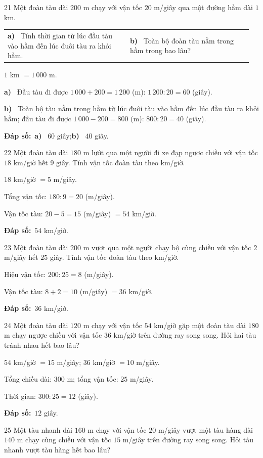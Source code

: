 \documentclass[11pt]{article}
\makeatletter
\newif\ifsol \solfalse
\renewcommand{\arraystretch}{1.35}
\providecommand{\AnsWord}{Đáp số}
\newcommand{\dapso}[1]{\par\textbf{\AnsWord:}\ #1}
\newcommand{\probsol}[1]{%
  \begin{lrbox}{\solmeasure}\begin{minipage}{\dimexpr\linewidth-24pt\relax}#1\end{minipage}\end{lrbox}%
  \ifsol
    \begin{solbox}#1\end{solbox}%
  \else
    \setlength{\solht}{\dimexpr\ht\solmeasure+\dp\solmeasure+0.85cm\relax}%
    \ifdim\solht<1.35cm\setlength{\solht}{1.35cm}\fi
    \begin{tcolorbox}[colback=white,colframe=Line,boxrule=0.8pt,arc=5pt,
      left=8pt,right=8pt,top=4pt,bottom=4pt,height=\solht]{\footnotesize\color{Slate}\itshape\WorkWord}\end{tcolorbox}%
  \fi}
\newcommand{\pa}[1]{\textbf{#1)}\ }
\newenvironment{cols2}{\par\vspace{3pt}\noindent\setlength{\tabcolsep}{0pt}\renewcommand{\arraystretch}{1.3}%
  \begin{tabular}{@{}>{\raggedright\arraybackslash\rule{0pt}{4.4ex}}p{0.48\linewidth}<{\rule[-2.3ex]{0pt}{0pt}}@{\hspace{0.03\linewidth}}>{\raggedright\arraybackslash\rule{0pt}{4.4ex}}p{0.48\linewidth}<{\rule[-2.3ex]{0pt}{0pt}}@{}}}%
  {\end{tabular}\par}
\newcommand{\gap}{\vspace{0.3cm}}
\def\WorkWord{Bài làm:}
\def\AnsWord{Đáp số}
\makeatother
\begin{document}
\gap
\begin{probbox}{21}{\relax}
Một đoàn tàu dài $200$ m chạy với vận tốc $20$ m/giây qua một đường hầm dài $1$ km.
\begin{cols2}
\pa{a} Tính thời gian từ lúc đầu tàu vào hầm đến lúc đuôi tàu ra khỏi hầm. & \pa{b} Toàn bộ đoàn tàu nằm trong hầm trong bao lâu?
\end{cols2}
\end{probbox}
\probsol{
$1$ km $=1\,000$ m.\par
\pa{a} Đầu tàu đi được $1\,000+200=1\,200$ (m): $1\,200:20=60$ (giây).\par
\pa{b} Toàn bộ tàu nằm trong hầm từ lúc đuôi tàu vào hầm đến lúc đầu tàu ra khỏi hầm; đầu tàu đi được $1\,000-200=800$ (m): $800:20=40$ (giây).
\dapso{\pa{a} $60$ giây;\quad \pa{b} $40$ giây.}}
\gap
\begin{probbox}{22}{\relax}
Một đoàn tàu dài $180$ m lướt qua một người đi xe đạp ngược chiều với vận tốc $18$ km/giờ hết $9$ giây. Tính vận tốc đoàn tàu theo km/giờ.
\end{probbox}
\probsol{
$18$ km/giờ $=5$ m/giây.\par Tổng vận tốc: $180:9=20$ (m/giây).\par
Vận tốc tàu: $20-5=15$ (m/giây) $=54$ km/giờ.
\dapso{$54$ km/giờ.}}
\gap
\begin{probbox}{23}{\relax}
Một đoàn tàu dài $200$ m vượt qua một người chạy bộ cùng chiều với vận tốc $2$ m/giây hết $25$ giây. Tính vận tốc đoàn tàu theo km/giờ.
\end{probbox}
\probsol{
Hiệu vận tốc: $200:25=8$ (m/giây).\par Vận tốc tàu: $8+2=10$ (m/giây) $=36$ km/giờ.
\dapso{$36$ km/giờ.}}
\gap
\begin{probbox}{24}{\relax}
Một đoàn tàu dài $120$ m chạy với vận tốc $54$ km/giờ gặp một đoàn tàu dài $180$ m chạy ngược chiều với vận tốc $36$ km/giờ trên đường ray song song. Hỏi hai tàu tránh nhau hết bao lâu?
\end{probbox}
\probsol{
$54$ km/giờ $=15$ m/giây; $36$ km/giờ $=10$ m/giây.\par Tổng chiều dài: $300$ m; tổng vận tốc: $25$ m/giây.\par Thời gian: $300:25=12$ (giây).
\dapso{$12$ giây.}}
\gap
\begin{probbox}{25}{\relax}
Một tàu nhanh dài $160$ m chạy với vận tốc $20$ m/giây vượt một tàu hàng dài $140$ m chạy cùng chiều với vận tốc $15$ m/giây trên đường ray song song. Hỏi tàu nhanh vượt tàu hàng hết bao lâu?
\end{probbox}
\end{document}
